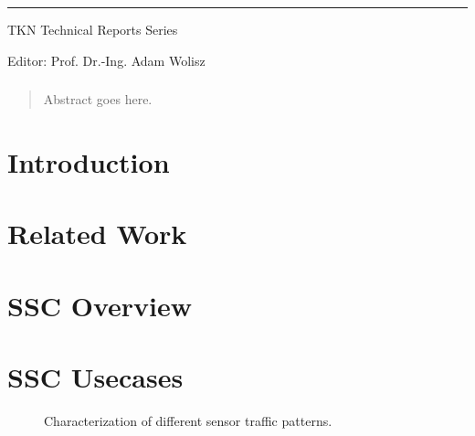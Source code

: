\documentclass[11pt,a4paper,headinclude,footinclude,chapterprefix=on]{scrreprt}
\begin{document}
{\begin{minipage}[][11.0cm][c]{14.5cm}
\end{minipage}

\setlength{\fboxrule}{0.4pt}
\setlength{\fboxsep}{0.4pt}

\begin{center}

  \rule{15.5cm}{0.4pt}

  \vspace{0.5cm}

  {\huge {TKN Technical Reports Series}}

  \vspace{0.5cm}

  {\huge Editor: Prof. Dr.-Ing. Adam Wolisz}

  \vspace{0.5cm}

 \end{center}


}

\begin{abstract}
\subsection*{\abstractname}
Abstract goes here.
\end{abstract}

\tableofcontents


\chapter{Introduction}
\chapter{Related Work}
\chapter{SSC Overview}
\chapter{SSC Usecases}

\begin{figure}[hb]
\centering


\caption{Characterization of different sensor traffic patterns.}
\end{figure}
\end{document}
